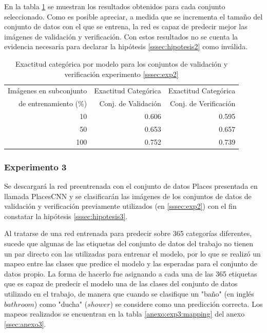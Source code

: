 En la tabla \ref{exp2:results} se muestran los resultados obtenidos para cada conjunto seleccionado. Como es posible apreciar, a medida que se incrementa el tamaño del conjunto de datos con el que se entrena, la red es capaz de predecir mejor las imágenes de validación y verificación. Con estos resultados no se cuenta la evidencia necesaria para declarar la hipótesis \ref{sssec:hipotesis2} como inválida.


\begin{table}[h!]
	\centering
	\begin{tabular}{| r | r | r |}
		\toprule
		Imágenes en subconjunto & Exactitud Categórica &  Exactitud Categórica \\
		de entrenamiento (\%) & Conj. de Validación &  Conj. de Verificación \\
		\midrule
		10 & 0.606 & 0.595 \\
		50 & 0.653 & 0.657 \\
		100 & 0.752 & 0.739 \\
		\bottomrule
	\end{tabular}
	\caption{Exactitud categórica por modelo para los conjuntos de validación y verificación experimento \ref{sssec:exp2}}
	\label{exp2:results}
\end{table}


\subsubsection{Experimento 3} \label{sssec:exp3}
Se descargará la red preentrenada con el conjunto de datos Places presentada en \cite{learning_deep_features} llamada PlacesCNN y se clasificarán las imágenes de los conjuntos de datos de validación y verificación previamente utilizados (en \ref{sssec:exp2}) con el fin constatar la hipótesis \ref{sssec:hipotesis3}.

Al tratarse de una red entrenada para predecir sobre 365 categorías diferentes, sucede que algunas de las etiquetas del conjunto de datos del trabajo \cite{learning_deep_features} no tienen un par directo con las utilizadas para entrenar el modelo, por lo que se realizó un mapeo entre las clases que predice el modelo y las esperadas para el conjunto de datos propio. La forma de hacerlo fue asignando a cada una de las 365 etiquetas que es capaz de predecir el modelo una de las clases del conjunto de datos utilizado en el trabajo, de manera que cuando se clasifique un "baño" (en inglés \(bathroom\)) como "ducha" (\(shower\)) se considere como una predicción correcta. Los mapeos realizados se encuentran en la tabla \ref{anexo:exp3:mapping} del anexo \ref{ssec:anexo3}. 

